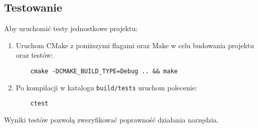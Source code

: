 \subsection{Testowanie}
Aby uruchomić testy jednostkowe projektu:
\begin{enumerate}
    \item Uruchom CMake z poniższymi flagami oraz Make w celu budowania projektu oraz testów:
    \begin{verbatim}
    cmake -DCMAKE_BUILD_TYPE=Debug .. && make
    \end{verbatim}
    \item Po kompilacji w katalogu \texttt{build/tests} uruchom polecenie:
    \begin{verbatim}
    ctest
    \end{verbatim}
\end{enumerate}
Wyniki testów pozwolą zweryfikować poprawność działania narzędzia.